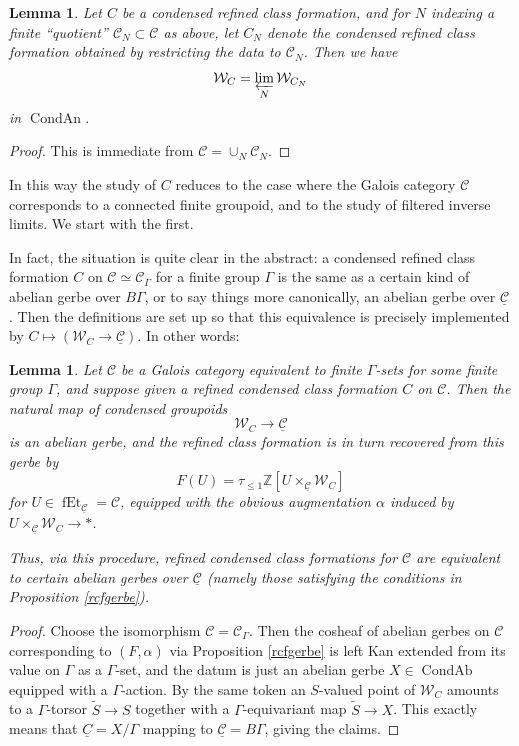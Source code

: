 \documentclass[12pt]{article}
\newtheorem{lemma}[theorem]{Lemma}
\theoremstyle{definition}
\newcommand{\on}{\operatorname}
\newcommand{\mc}{\mathcal}
\newcommand{\mbb}{\mathbb}
\newcommand{\ul}{\underline}
\begin{document}
\begin{lemma}\label{rcfinverselimit}
Let $C$ be a condensed refined class formation, and for $N$ indexing a finite ``quotient'' $\mc{C}_N\subset \mc{C}$ as above, let $C_N$ denote the condensed refined class formation obtained by restricting the data to $\mc{C}_N$. Then we have
$$\mc{W}_C = \varprojlim_N \mc{W}_{C_N}$$
in $\on{CondAn}$.
\end{lemma}
\begin{proof}
This is immediate from $\mc{C}=\cup_N \mc{C}_N$.
\end{proof}

In this way the study of $C$ reduces to the case where the Galois category $\mc{C}$ corresponds to a connected finite groupoid, and to the study of filtered inverse limits.  We start with the first.

In fact, the situation is quite clear in the abstract: a condensed refined class formation $C$ on $\mc{C}\simeq \mc{C}_\Gamma$ for a finite group $\Gamma$ is the same as a certain kind of abelian gerbe over $B\Gamma$, or to say things more canonically, an abelian gerbe over $\ul{\mc{C}}$.  Then the definitions are set up so that this equivalence is precisely implemented by $C\mapsto (\mc{W}_C\to \ul{\mc{C}})$.  In other words:

\begin{lemma}
Let $\mc{C}$ be a Galois category equivalent to finite $\Gamma$-sets for some finite group $\Gamma$, and suppose given a refined condensed class formation $C$ on $\mc{C}$.  Then the natural map of condensed groupoids
$$\mc{W}_C \to \ul{\mc{C}}$$
is an abelian gerbe, and the refined class formation is in turn recovered from this gerbe by 
$$F(U) = \tau_{\leq 1}\mbb{Z}[U\times_{\ul{\mc{C}}}\mc{W}_C]$$
for $U\in \on{fEt}_{\ul{\mc{C}}}=\mc{C}$, equipped with the obvious augmentation $\alpha$ induced by $U\times_{\ul{\mc{C}}}\mc{W}_C\to\ast$.

Thus, via this procedure, refined condensed class formations for $\mc{C}$ are equivalent to certain abelian gerbes over $\ul{\mc{C}}$ (namely those satisfying the conditions in Proposition \ref{rcfgerbe}).
\end{lemma}
\begin{proof}
Choose the isomorphism $\mc{C}=\mc{C}_\Gamma$.  Then the cosheaf of abelian gerbes on $\mc{C}$ corresponding to $(F,\alpha)$ via Proposition \ref{rcfgerbe} is left Kan extended from its value on $\Gamma$ as a $\Gamma$-set, and the datum is just an abelian gerbe $X\in \on{CondAb}$ equipped with a $\Gamma$-action.  By the same token an $S$-valued point of $\mc{W}_C$ amounts to a $\Gamma$-torsor $\widetilde{S}\to S$ together with a $\Gamma$-equivariant map $\widetilde{S} \to X$.  This exactly means that $\ul{C} = X/\Gamma$ mapping to $\ul{\mc{C}} = B\Gamma$, giving the claims.
\end{proof}
\end{document}
